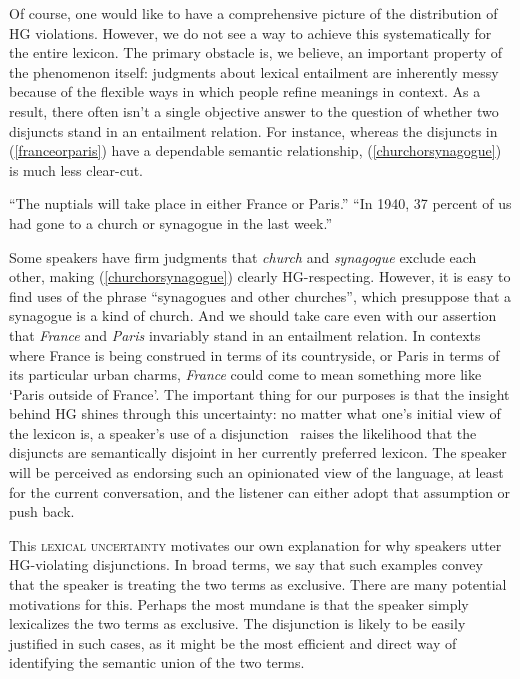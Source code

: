\documentclass[12pt,twoside]{article}
\newcommand{\subeg}[2]{(\ref{#2})}
\newcommand{\word}[1]{\emph{#1}}
\newcommand{\highlight}[1]{{\color{maroon}#1}}
\renewcommand{\_}{\textbf{\textunderscore\hspace{-4pt}\textunderscore\hspace{-3pt}\textunderscore\hspace{-4pt}\textunderscore}\hspace{0.5pt}}			%
\newcommand{\technicalTerm}[1]{\textsc{#1}}
\begin{document}
Of course, one would like to have a comprehensive picture of the
distribution of HG violations. However, we do not see a way to achieve
this systematically for the entire lexicon. The primary obstacle is,
we believe, an important property of the phenomenon itself: judgments
about lexical entailment are inherently messy because of the flexible
ways in which people refine meanings in context. As a result, there
often isn't a single objective answer to the question of whether two
disjuncts stand in an entailment relation. For instance, whereas the
disjuncts in \subeg{exclusive}{franceorparis} have a dependable
semantic relationship, \subeg{exclusive}{churchorsynagogue} is much
less clear-cut.
%
\begin{exe}
\ex\label{exclusive}
  \begin{xlist}
  \ex\label{franceorparis} ``The nuptials will take place in either
    \highlight{France or Paris}.''
  \ex\label{churchorsynagogue} ``In 1940, 37 percent of us had gone
    to a \highlight{church or synagogue} in the last week.''
  \end{xlist}
\end{exe}
%
Some speakers have firm judgments that \word{church} and
\word{synagogue} exclude each other, making
\subeg{exclusive}{churchorsynagogue} clearly HG-respecting. However,
it is easy to find uses of the phrase ``synagogues and other
churches'', which presuppose that a synagogue is a kind of church. And
we should take care even with our assertion that \word{France} and
\word{Paris} invariably stand in an entailment relation. In contexts
where France is being construed in terms of its countryside, or Paris
in terms of its particular urban charms, \word{France} could come to
mean something more like `Paris outside of France'. The important
thing for our purposes is that the insight behind HG shines through
this uncertainty: no matter what one's initial view of the lexicon is,
a speaker's use of a disjunction \XorY\ raises the likelihood that the
disjuncts are semantically disjoint in her currently preferred
lexicon. The speaker will be perceived as endorsing such an
opinionated view of the language, at least for the current
conversation, and the listener can either adopt that assumption or
push back.

This \technicalTerm{lexical uncertainty} motivates our own explanation
for why speakers utter HG-violating disjunctions. In broad terms, we
say that such examples convey that the speaker is treating the two
terms as exclusive. There are many potential motivations for
this. Perhaps the most mundane is that the speaker simply lexicalizes
the two terms as exclusive. The disjunction is likely to be easily
justified in such cases, as it might be the most efficient and direct
way of identifying the semantic union of the two terms.
\end{document}
